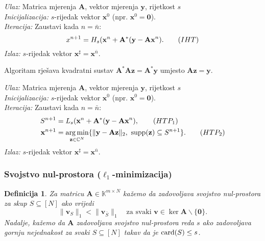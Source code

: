 \documentclass{beamer}
\newtheorem{defn}[thm]{Definicija}
\newcommand{\C}{\mathbb{C}}
\newcommand{\K}{\mathbb{K}}
\newcommand{\vect}[1]{\mathbf{#1}}
\renewcommand{\vec}{\vect}
\newcommand{\card}{\text{\normalfont{card}}}
\newcommand{\supp}{\text{\normalfont{supp}}}
\newcommand{\norm}[1]{\|{#1}\|}
\DeclareMathOperator*{\argmin}{arg\,min}
\newenvironment{alg}[1]
{
    \bigskip
    \begin{tcolorbox}[arc=0mm,boxrule=1.2pt,colframe=black,colback=white,detach title, before upper={\medskip\begin{center}\textbf{#1}\end{center}\hline\newline\medskip},frame hidden]
    \medskip
}
{
    \medskip
\end{tcolorbox}
}
\begin{document}
\begin{frame}
    \begin{alg}{IHT (\textit{Iterative hard thresholding})}
    \textit{Ulaz:} Matrica mjerenja $\vec A$, vektor mjerenja $\vec y$, rijetkost $s$ \\
    \textit{Inicijalizacija:} $s$-rijedak vektor $\vec x^0$ (npr. $\vec x^0 = \vec 0$).\\
    \textit{Iteracija:} Zaustavi kada $n = \bar{n}$:
        \begin{equation}
            x^{n+1} = H_s(\vec x^n + \vec A^* (\vec y - \vec{Ax}^n).\tag{$IHT$}\label{iht}\\
        \end{equation}
        \textit{Izlaz:} $s$-rijedak vektor $\vec x^{\sharp}=\vec x^{\bar n}$.
\end{alg}
Algoritam rje\v{s}ava kvadratni sustav $\vec A^* \vec A \vec z= \vec A^* \vec y$ umjesto $\vec{Az}=\vec y$.
\end{frame}

\begin{frame}
\begin{alg}{HTP}
    \textit{Ulaz:} Matrica mjerenja $\vec A$, vektor mjerenja $\vec y$, rijetkost $s$ \\
    \textit{Inicijalizacija:} $s$-rijedak vektor $\vec x^0$ (npr. $\vec x^0 = \vec 0$).\\
    \textit{Iteracija:} Zaustavi kada $n = \bar{n}$:
        \begin{align*}
            S^{n+1} &= L_s(\vec x^n + \vec A^* (\vec y - \vec{Ax}^n),\tag{$HTP_1$}\label{htp_1}\\
            \vec x^{n+1} &= \argmin_{\vec z \in \C^N}\{ \norm{\vec y - \vec{Az}}_2,\ \supp(\vec z) \subseteq S^{n+1} \}.\tag{$HTP_2$}\label{htp_2}
        \end{align*}
        \textit{Izlaz:} $s$-rijedak vektor $\vec x^{\sharp}=\vec x^{\bar n}$.
\end{alg}
\end{frame}

\begin{frame}
    \frametitle{Svojstvo nul-prostora ($\ell_1$-minimizacija)} 
\begin{defn}
    Za matricu $\vec A \in \K^{m \times N}$ ka\v{z}emo da zadovoljava \textit{svojstvo nul-prostora} za skup $S \subseteq [N]$ ako vrijedi
    \begin{equation}\label{svojstvo_nul_prostora}
        \norm{\vec v_S}_1 < \norm{\vec v_{\bar{S}}}_1  \quad \text{za svaki }\vec v \in \ker \vec A \backslash \{\vec 0\}.
    \end{equation}
    Nadalje, ka\v{z}emo da $\vec A$ zadovoljava svojstvo nul-prostora reda $s$ ako zadovoljava gornju nejednakost za svaki $S \subseteq [N]$ takav da je $\card(S) \leq s$.
\end{defn}
\end{frame}
\end{document}
